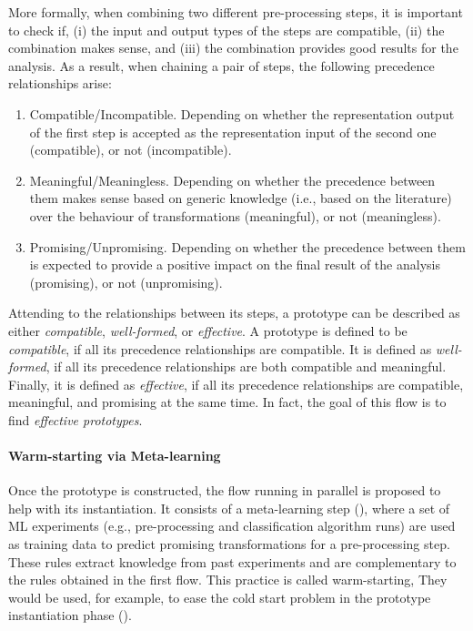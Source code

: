 More formally, when combining two different pre-processing steps, it is important to check if, (i) the input and output types of the steps are compatible, (ii) the combination makes sense, and (iii) the combination provides good results for the analysis.
As a result, when chaining a pair of steps, the following precedence relationships arise:
\begin{enumerate}
    \item Compatible/Incompatible. Depending on whether the representation output of the first step is accepted as the representation input of the second one (compatible), or not (incompatible).
    \item Meaningful/Meaningless. Depending on whether the precedence between them makes sense based on generic knowledge (i.e., based on the literature) over the behaviour of transformations (meaningful), or not (meaningless).
    \item Promising/Unpromising. Depending on whether the precedence between them is expected to provide a positive impact on the final result of the analysis (promising), or not (unpromising).
\end{enumerate}

Attending to the relationships between its steps, a prototype can be described as either \textit{compatible}, \textit{well-formed}, or \textit{effective}.
A prototype is defined to be \textit{compatible}, if all its precedence relationships are compatible.
It is defined as \textit{well-formed}, if all its precedence relationships are both compatible and meaningful.
Finally, it is defined as \textit{effective}, if all its precedence relationships are compatible, meaningful, and promising at the same time.
In fact, the goal of this flow is to find \textit{effective prototypes}.

\paragraph{Warm-starting via Meta-learning} Once the prototype is constructed, the flow running in parallel is proposed to help with its instantiation.
It consists of a meta-learning step  (), where a set of ML experiments (e.g., pre-processing and classification algorithm runs) are used as training data to predict promising transformations for a pre-processing step.
These rules extract knowledge from past experiments and are complementary to the rules obtained in the first flow.
This practice is called warm-starting,
They would be used, for example, to ease the cold start problem in the prototype instantiation phase  ().

